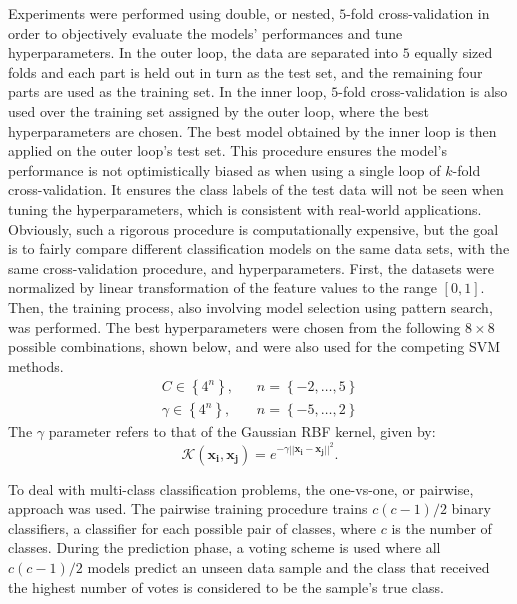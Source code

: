 \documentclass[reqno]{vcuthesis}
\newcommand{\set}[1]{{\left\{#1\right\}}}
\newcommand{\norm}[1]{{||#1||}}
\numberwithin{equation}{chapter}
\begin{document}
Experiments were performed using double, or nested, $5$-fold cross-validation in order to objectively evaluate the models' performances and tune hyperparameters. In the outer loop, the data are separated into $5$ equally sized folds and each part is held out in turn as the test set, and the remaining four parts are used as the training set. In the inner loop, $5$-fold cross-validation is also used over the training set assigned by the outer loop, where the best hyperparameters are chosen. The best model obtained by the inner loop is then applied on the outer loop's test set. This procedure ensures the model's performance is not optimistically biased as when using a single loop of $k$-fold cross-validation. It ensures the class labels of the test data will not be seen when tuning the hyperparameters, which is consistent with real-world applications. Obviously, such a rigorous procedure is computationally expensive, but the goal is to fairly compare different classification models on the same data sets, with the same cross-validation procedure, and hyperparameters. First, the datasets were normalized by linear transformation of the feature values to the range $[0,1]$. Then, the training process, also involving model selection using pattern search, was performed. The best hyperparameters were chosen from the following $8 \times 8$ possible combinations, shown below, and were also used for the competing SVM methods.
\begin{subequations}
\begin{align*}
C \in \set{4^n}, & \,\,\,\,\,n = \set{-2, \ldots, 5} \\
\gamma \in \set{4^n},  & \,\,\,\,\,n = \set{-5, \ldots, 2} 
\end{align*}
\end{subequations}
The $\gamma$ parameter refers to that of the Gaussian RBF kernel, given by:
\begin{equation}
\label{eq:rbf}
\mathcal{K}(\bm{x_i},\bm{x_j}) = e^{-\gamma\norm{\bm{x_i} - \bm{x_j}}^2}.
\end{equation}

To deal with multi-class classification problems, the one-vs-one, or pairwise, approach was used. The pairwise training procedure trains $c(c - 1)/2$ binary classifiers, a classifier for each possible pair of classes, where $c$ is the number of classes. During the prediction phase, a voting scheme is used where all $c(c - 1)/2$ models predict an unseen data sample and the class that received the highest number of votes is considered to be the sample’s true class.
\end{document}
